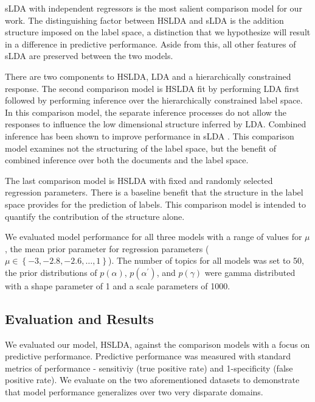 sLDA with independent regressors is the most salient comparison model
for our work. The distinguishing factor between HSLDA and sLDA is the
addition structure imposed on the label space, a distinction that we
hypothesize will result in a difference in predictive performance. 
Aside from this, all other features of sLDA are preserved between the two models.

There are two components to HSLDA, LDA and a hierarchically constrained response.
The second comparison model is HSLDA fit by performing LDA first followed by
performing inference over the hierarchically constrained label space. In this
comparison model, the separate inference processes do not allow the responses
to influence the low dimensional structure inferred by LDA. Combined inference
has been shown to improve performance in sLDA \citep{BleiMcAuliffe2008}. This
comparison model examines not the structuring of the label space, but the benefit
of combined inference over both the documents and the label space.

The last comparison model is HSLDA with fixed and randomly selected regression
parameters. There is a baseline benefit that the structure in the label space 
provides for the prediction of labels. This comparison model is intended to
quantify the contribution of the structure alone.

We evaluated model performance for all three models with a range of
values for $\mu$, the mean prior parameter for regression parameters 
($\mu\in\left\{ -3,-2.8,-2.6,\ldots,1\right\}$). The number of topics for all
models was set to 50, the prior distributions of
$p\left(\alpha\right)$, $p\left(\alpha^{\prime}\right)$, and $p\left(\gamma\right)$ were gamma distributed with a shape parameter of 1
and a scale parameters of 1000.


\subsection{Evaluation and Results}


We evaluated our model, HSLDA, against the comparison models with a focus
on predictive performance. Predictive performance was measured with
standard metrics of performance - sensitiviy (true positive rate) and 
1-specificity (false positive rate). We evaluate on the two aforementioned
datasets to demonstrate that model performance generalizes over two very disparate
domains.

